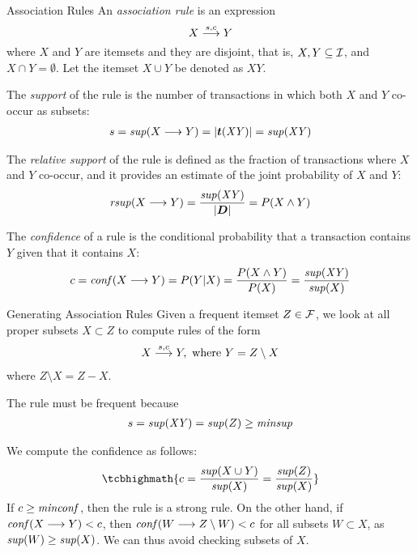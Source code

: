 \begin{frame}{Association Rules}
An {\it association rule}
is an expression 
$$X \arule{s,c} Y$$
where $X$ and $Y$ are itemsets and they are disjoint, that is,
$X,Y \subseteq {\mathcal I}$, and $X \cap Y = \emptyset$.
Let the itemset $X \cup Y$ be denoted as $\mathit{XY}$.

\smallskip
The
{\em support}
of the rule is the number of transactions in which
both $X$ and $Y$ co-occur as subsets:
\begin{align*}
  s = \supp(X \arule Y) = \card{\vT(\mathit{XY})} = \supp(\mathit{XY})
\end{align*}

\smallskip
The {\em relative support} of the rule is def\/{i}ned as the fraction of transactions
where $X$ and $Y$ co-occur, and it provides an estimate of the joint probability of $X$ and $Y$:
\begin{align*}
  \rsupp(X \arule Y) =  \frac{\supp(\mathit{XY})}{\card{\bD}} =
  P(X \wedge Y)
\end{align*}

\smallskip
The {\em conf\/{i}dence}
of a rule is the conditional probability
that a transaction contains $Y$ given that it contains $X$:
\begin{align*}
c = \conff(X \arule Y) = P(Y|X) =
\frac{P(X \wedge Y)}{P(X)} =
 \frac{\supp (\mathit{XY})}{\supp (X)}
\end{align*}

\end{frame}



\begin{frame}{Generating Association Rules}
Given a frequent itemset $Z \in {\mathcal F}$,
we look at all proper subsets
$X\subset Z$ to compute rules of the form
\begin{align*}
  X \arule{s,c} Y, \text{ where } Y = Z\setminus X
\end{align*}
where $Z \setminus X  = Z - X$.

\medskip
The rule must be frequent
because
\begin{align*}
s = \mathit{sup}(\mathit{XY}) = \mathit{sup}(Z) \geq \mathit{minsup}
\end{align*}

\medskip
We compute the conf\/{i}dence as follows:
\begin{align*}
\tcbhighmath{
c = \frac{\supp(X \cup Y)}{\supp(X)} = \frac{\supp(Z)}{\supp(X)}
}
\end{align*}
If $c \geq \mathit{minconf}$, then the rule is a strong rule. On the other
hand, if $\conff(X\arule Y) < c$, then
$\conff(W \arule Z \setminus W) < c$ for all subsets $W \subset X$,
as $\mathit{sup}(W) \ge \mathit{sup}(X)$. We can thus
avoid checking subsets of $X$.
\end{frame}


